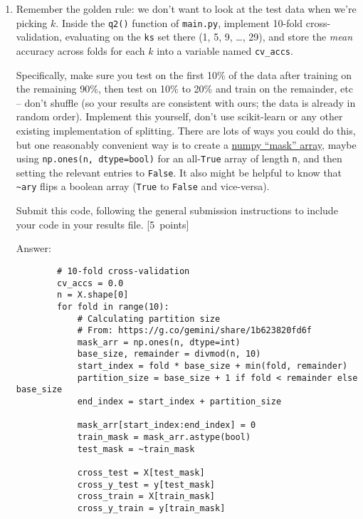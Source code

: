 \documentclass{article}
\newcommand{\blu}[1]{{\textcolor{blu}{#1}}}
\newenvironment{answer}{\par\begingroup\color{gre}Answer: }{\endgroup}
\let\ask\blu
\newcommand\pts[1]{\textcolor{pointscolour}{[#1~points]}}
\begin{document}
    \begin{enumerate}
        \item Remember the golden rule: we don't want to look at the test data when we're picking $k$. Inside the \texttt{q2()} function of \texttt{main.py}, implement 10-fold cross-validation, evaluating on the \texttt{ks} set there (1, 5, 9, \dots, 29), and store the \emph{mean} accuracy across folds for each $k$ into a variable named \texttt{cv\_accs}.

        Specifically, make sure you test on the first 10\% of the data after training on the remaining 90\%, then test on 10\% to 20\% and train on the remainder, etc -- don't shuffle (so your results are consistent with ours; the data is already in random order). Implement this yourself, don't use scikit-learn or any other existing implementation of splitting. There are lots of ways you could do this, but one reasonably convenient way is to create a \href{https://numpy.org/doc/stable/user/basics.indexing.html#boolean-or-mask-index-arrays}{numpy ``mask'' array}, maybe using \texttt{np.ones(n, dtype=bool)} for an all-\texttt{True} array of length \texttt{n}, and then setting the relevant entries to \texttt{False}. It also might be helpful to know that \texttt{\textasciitilde ary} flips a boolean array (\texttt{True} to \texttt{False} and vice-versa).

        \ask{Submit this code}, following the general submission instructions to include your code in your results file. \pts{5}
        \begin{answer}
        \begin{verbatim}
        # 10-fold cross-validation
        cv_accs = 0.0
        n = X.shape[0]
        for fold in range(10):
            # Calculating partition size
            # From: https://g.co/gemini/share/1b623820fd6f
            mask_arr = np.ones(n, dtype=int)
            base_size, remainder = divmod(n, 10)
            start_index = fold * base_size + min(fold, remainder)
            partition_size = base_size + 1 if fold < remainder else base_size
            end_index = start_index + partition_size

            mask_arr[start_index:end_index] = 0
            train_mask = mask_arr.astype(bool)
            test_mask = ~train_mask
            
            cross_test = X[test_mask]
            cross_y_test = y[test_mask]
            cross_train = X[train_mask]
            cross_y_train = y[train_mask]


\end{verbatim}
\end{answer}
\end{enumerate}
\end{document}
